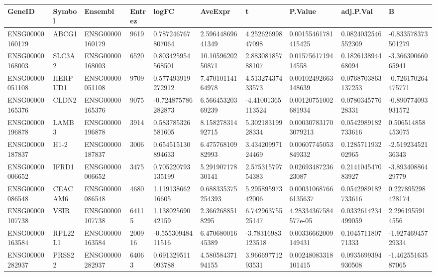 \begingroup
\tiny
\setlength{\tabcolsep}{2pt}
\renewcommand{\arraystretch}{1.18}
\begin{tabular}{@{}llllllllll@{}}
\toprule
GeneID & Symbol & Ensembl & Entrez & logFC & AveExpr & t & P.Value & adj.P.Val & B \\
\midrule
ENSG00000160179 & ABCG1 & ENSG00000160179 & 9619 & 0.787246767807064 & 2.59644869641349 & 4.25262699847098 & 0.00155461781415425 & 0.0824032546552309 & -0.833578373501279 \\
ENSG00000168003 & SLC3A2 & ENSG00000168003 & 6520 & 0.803425954568501 & 10.1059620250871 & 2.88308185788107 & 0.0157561719414558 & 0.182613894468094 & -3.36630066065941 \\
ENSG00000051108 & HERPUD1 & ENSG00000051108 & 9709 & 0.577493919272912 & 7.47010114164978 & 4.51327437433573 & 0.00102492663148639 & 0.0768703863137253 & -0.726170264475771 \\
ENSG00000165376 & CLDN2 & ENSG00000165376 & 9075 & -0.724875786282873 & 6.56645320369239 & -4.41001365113524 & 0.00120751002681934 & 0.078034577628331 & -0.890774093931572 \\
ENSG00000196878 & LAMB3 & ENSG00000196878 & 3914 & 0.583785326581605 & 8.15827831492715 & 5.30218319928334 & 0.000307831703079213 & 0.0542989182733616 & 0.506514858453075 \\
ENSG00000187837 & H1-2 & ENSG00000187837 & 3006 & 0.654515130894633 & 6.47576810982993 & 3.43420997124469 & 0.00607745053849332 & 0.128571193202965 & -2.51923452136343 \\
ENSG00000006652 & IFRD1 & ENSG00000006652 & 3475 & 0.705220793135199 & 5.29190717830141 & 2.57531579754383 & 0.0269348723623087 & 0.214104547083927 & -3.89340886429779 \\
ENSG00000086548 & CEACAM6 & ENSG00000086548 & 4680 & 1.11913866216605 & 0.688335375254393 & 5.29589597342006 & 0.000310687666135637 & 0.0542989182733616 & 0.227895298428174 \\
ENSG00000107738 & VSIR & ENSG00000107738 & 64115 & 1.13802569042159 & 2.3662688518295 & 6.74296375525147 & 4.28334367584577e-05 & 0.0332614234499059 & 2.2961955914556 \\
ENSG00000163584 & RPL22L1 & ENSG00000163584 & 200916 & -0.55530948411516 & 6.47068001645389 & -3.78316983123518 & 0.00336662009149431 & 0.104571180771333 & -1.92746945729334 \\
ENSG00000282937 & PRSS22 & ENSG00000282937 & 64063 & 0.691329511093788 & 4.58058437194155 & 3.96669771293531 & 0.00248083318101415 & 0.0935699394930508 & -1.46255163587065 \\

\end{tabular}
